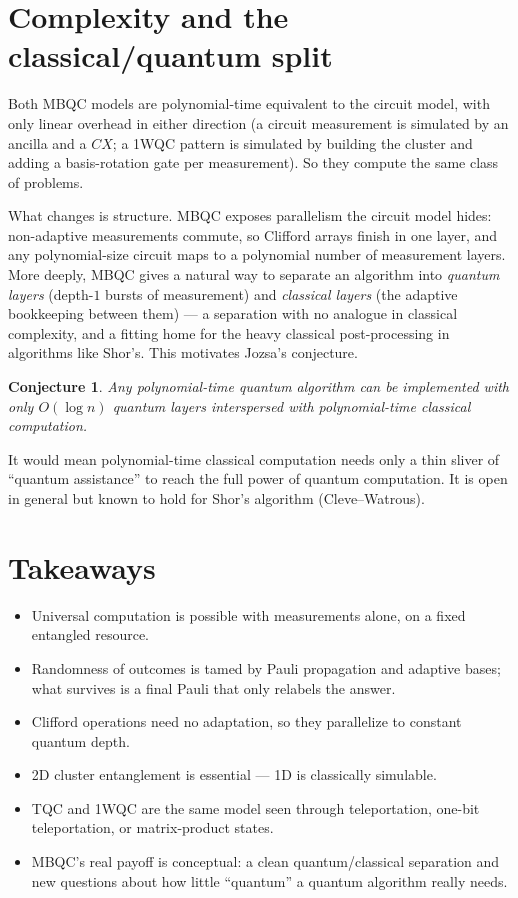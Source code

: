 \documentclass[11pt]{article}
\theoremstyle{plain}
\newtheorem*{conjecture*}{Conjecture}
\begin{document}
\section{Complexity and the classical/quantum split}
Both MBQC models are polynomial-time equivalent to the circuit model, with only linear overhead in
either direction (a circuit measurement is simulated by an ancilla and a $CX$; a 1WQC pattern is
simulated by building the cluster and adding a basis-rotation gate per measurement). So they compute
the same class of problems.

What changes is structure. MBQC exposes parallelism the circuit model hides: non-adaptive measurements
commute, so Clifford arrays finish in one layer, and any polynomial-size circuit maps to a polynomial
number of measurement layers. More deeply, MBQC gives a natural way to separate an algorithm into
\emph{quantum layers} (depth-$1$ bursts of measurement) and \emph{classical layers} (the adaptive
bookkeeping between them) --- a separation with no analogue in classical complexity, and a fitting home
for the heavy classical post-processing in algorithms like Shor's. This motivates Jozsa's conjecture.

\begin{conjecture*}
Any polynomial-time quantum algorithm can be implemented with only $O(\log n)$ quantum layers
interspersed with polynomial-time classical computation.
\end{conjecture*}

\noindent It would mean polynomial-time classical computation needs only a thin sliver of ``quantum
assistance'' to reach the full power of quantum computation. It is open in general but known to hold
for Shor's algorithm (Cleve--Watrous).

\section*{Takeaways}
\begin{itemize}[leftmargin=*]
  \item Universal computation is possible with measurements alone, on a fixed entangled resource.
  \item Randomness of outcomes is tamed by Pauli propagation and adaptive bases; what survives is a
  final Pauli that only relabels the answer.
  \item Clifford operations need no adaptation, so they parallelize to constant quantum depth.
  \item 2D cluster entanglement is essential --- 1D is classically simulable.
  \item TQC and 1WQC are the same model seen through teleportation, one-bit teleportation, or
  matrix-product states.
  \item MBQC's real payoff is conceptual: a clean quantum/classical separation and new questions about
  how little ``quantum'' a quantum algorithm really needs.
\end{itemize}
\end{document}
